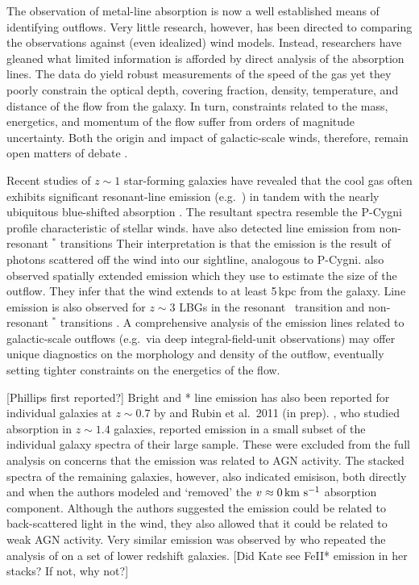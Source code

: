 \documentclass[12pt,preprint]{aastex}
\begin{document}
The observation of metal-line absorption is now a well established
means of identifying outflows. Very little research,
however,  has been directed
to comparing the observations against (even idealized) wind
models.  Instead, researchers have gleaned what limited information
is afforded by direct analysis of the absorption lines.  The data do yield
robust measurements of the speed of the gas yet they poorly constrain the
optical depth, covering fraction, density, temperature, and distance
of the flow from the galaxy.   In turn, constraints related to the
mass, energetics, and momentum of the flow suffer from
orders of magnitude uncertainty.  Both the origin and impact of
galactic-scale winds, therefore, remain open matters of debate
\citep{debate}.

Recent studies of $z \sim 1$ star-forming galaxies have revealed that
the cool gas often exhibits significant resonant-line emission (e.g.\
) in
tandem with the nearly ubiquitous blue-shifted absorption
\citep{wcp+09,rwk+10}.  The resultant spectra resemble the P-Cygni
profile characteristic of stellar winds.
\cite{rubin+10c} have also detected line
emission from non-resonant $^*$ transitions 
Their interpretation is that the emission is the result of photons
scattered off the wind into our sightline, analogous to P-Cygni.
\cite{rubin+10c} also observed spatially extended \ion{Mg}{2} emission
which they use to estimate the size of the outflow.  They infer that
the wind extends to at least 5\,kpc from the galaxy.  Line emission is
also observed for $z \sim 3$ LBGs in the resonant \lya\ transition
and non-resonant \ion{Si}{2}$^*$ transitions \citep{prs+02,shapley03}.
A comprehensive analysis of the emission lines
related to galactic-scale outflows
(e.g.\ via deep integral-field-unit observations) may offer unique
diagnostics on the morphology and density of the outflow, eventually
setting tighter constraints on the energetics of the flow.  

[Phillips first reported?]
Bright  and * line emission has also been
reported for individual galaxies at $z \sim 0.7$ by \cite{rubin+10c}
and Rubin et al.\ 2011 (in prep).
\cite{wcp+09}, who
studied  absorption in $z \sim 1.4$ galaxies, reported
\ion{Mg}{2} emission in a small subset of the individual galaxy
spectra of their large sample.  These were excluded from the full
analysis on concerns that the emission was related to AGN activity.
The stacked spectra of the remaining galaxies, however, also indicated
\ion{Mg}{2} emisison, both directly and when the authors modeled and
`removed' the $v \approx 0\, {\rm km~s^{-1}}$ absorption component.  Although the
authors suggested the emission could be related to back-scattered
light in the wind, they also allowed that it could be related to weak
AGN activity.   Very similar \ion{Mg}{2} emission was observed by
\cite{rwk+10} who repeated the analysis of \cite{wcp+09} on a set
of lower redshift galaxies. 
[Did Kate see FeII* emission in her stacks? If not, why not?]
\end{document}
